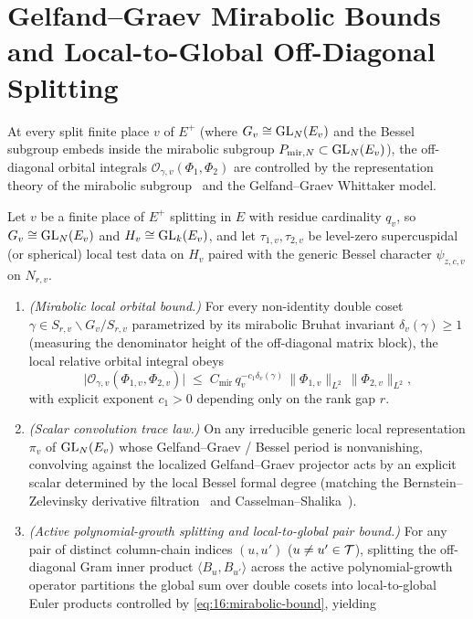 \section{Gelfand--Graev Mirabolic Bounds and Local-to-Global Off-Diagonal Splitting}
\label{sec:16:gg-offdiag}

At every split finite place $v$ of $E^+$ (where $G_v \cong \mathrm{GL}_N(E_v)$ and the Bessel subgroup embeds inside the mirabolic subgroup $P_{\mathrm{mir}, N} \subset \mathrm{GL}_N(E_v)$), the off-diagonal orbital integrals $\mathcal{O}_{\gamma, v}(\Phi_1, \Phi_2)$ are controlled by the representation theory of the mirabolic subgroup~\cite{BernsteinZelevinsky1977} and the Gelfand--Graev Whittaker model.

\begin{proposition}
\label{prop:16:gg-mirabolic}
Let $v$ be a finite place of $E^+$ splitting in $E$ with residue cardinality $q_v$, so $G_v \cong \mathrm{GL}_N(E_v)$ and $H_v \cong \mathrm{GL}_k(E_v)$, and let $\tau_{1, v}, \tau_{2, v}$ be level-zero supercuspidal (or spherical) local test data on $H_v$ paired with the generic Bessel character $\psi_{z, c, v}$ on $N_{r, v}$.
\begin{enumerate}[label=\textup{(\roman*)}]
\item \emph{(Mirabolic local orbital bound.)} For every non-identity double coset $\gamma \in S_{r, v} \backslash G_v / S_{r, v}$ parametrized by its mirabolic Bruhat invariant $\delta_v(\gamma) \ge 1$ (measuring the denominator height of the off-diagonal matrix block), the local relative orbital integral obeys
  \begin{equation}
  \label{eq:16:mirabolic-bound}
    \bigl|\mathcal{O}_{\gamma, v}(\Phi_{1, v}, \Phi_{2, v})\bigr|
    \;\le\; C_{\mathrm{mir}}\, q_v^{-c_1 \delta_v(\gamma)}\, \|\Phi_{1, v}\|_{L^2}\, \|\Phi_{2, v}\|_{L^2},
  \end{equation}
  with explicit exponent $c_1 > 0$ depending only on the rank gap $r$.
\item \emph{(Scalar convolution trace law.)} On any irreducible generic local representation $\pi_v$ of $\mathrm{GL}_N(E_v)$ whose Gelfand--Graev / Bessel period is nonvanishing, convolving against the localized Gelfand--Graev projector acts by an explicit scalar determined by the local Bessel formal degree (matching the Bernstein--Zelevinsky derivative filtration~\cite{BernsteinZelevinsky1977} and Casselman--Shalika~\cite{Casselman1989}).
\item \emph{(Active polynomial-growth splitting and local-to-global pair bound.)} For any pair of distinct column-chain indices $(u, u')$ ($u \neq u' \in \mathcal{T}$), splitting the off-diagonal Gram inner product $\langle B_u, B_{u'} \rangle$ across the active polynomial-growth operator partitions the global sum over double cosets into local-to-global Euler products controlled by \eqref{eq:16:mirabolic-bound}, yielding

\end{enumerate}
\end{proposition}
